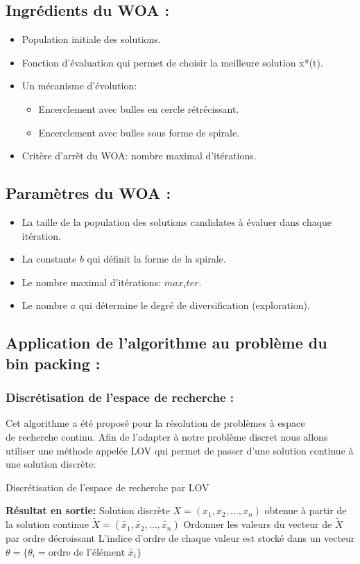 \documentclass[12pt]{article}
\begin{document}
\subsection{Ingrédients du WOA :}
\begin{itemize}
    \item Population initiale des solutions.
    \item Fonction d’évaluation qui permet de choisir la meilleure solution x*(t).
    \item Un mécanisme d'évolution:
    \begin{itemize}
        \item Encerclement avec bulles en cercle rétrécissant.
        \item Encerclement avec bulles sous forme de spirale.
    \end{itemize}
    \item Critère d'arrêt du WOA: nombre maximal d’itérations.    
\end{itemize}
\subsection{Paramètres du WOA :}
\begin{itemize}
    \item La taille de la population des solutions candidates à évaluer dans chaque itération.
    \item La constante \(b\) qui définit la forme de la spirale.
    \item Le nombre maximal d’itérations: \(max_iter\).
    \item Le nombre \(a\) qui détermine le degré de diversification (exploration).    
\end{itemize}
\subsection{Application de l’algorithme au problème du bin packing :}
\subsubsection{Discrétisation de l'espace de recherche :}
Cet algorithme a été proposé pour la résolution de problèmes à espace \\ de recherche continu. Afin de l’adapter à notre problème discret nous allons utiliser une méthode appelée LOV qui permet de passer d’une solution continue à une solution discrète:\\
\begin{algorithm}[H]
    \caption{Discrétisation de l'espace de recherche par LOV}
    \begin{algorithmic}
        \STATE \textbf{Résultat en sortie:} Solution discrète \(X = (x_1, x_2, \dots, x_n)\) obtenue à partir de la solution continue \(\tilde{X} = (\tilde{x_1}, \tilde{x_2}, \dots, \tilde{x_n})\)\;
        \STATE Ordonner les valeurs du vecteur de \(\tilde{X}\) par ordre décroissant\;
        \STATE L'indice d'ordre de chaque valeur est stocké dans un vecteur \(\theta = \{ \theta_i = \text{ordre de l'élément } \tilde{x_i}\}\)\;
    \end{algorithmic}  
\end{algorithm}
\end{document}
